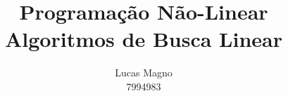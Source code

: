 \documentclass[a4paper,11pt]{article}
\date{}
\author{Lucas Magno \\ 7994983}
\title{Programação Não-Linear \\ Algoritmos de Busca Linear}
\begin{document}
    \begin{figure}
        \centering
        
    \end{figure}

    \begin{figure}
        \centering
        
    \end{figure}
\end{document}
